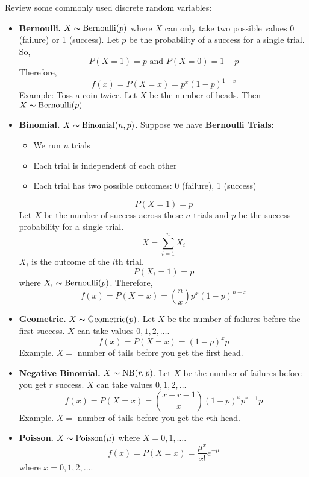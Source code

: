 Review some commonly used discrete random variables:
\begin{itemize}
    \item \textbf{Bernoulli.} $ X \thicksim \text{Bernoulli}(p) $
          where $ X $ can only take two possible values 0 (failure) or 1 (success).
          Let $ p $ be the probability of a success for a single trial. So,
          \[ P(X=1)=p\text{ and }P(X=0)=1-p \]
          Therefore,
          \[ f(x)=P(X=x)=p^x(1-p)^{1-x} \]
          Example: Toss a coin twice. Let $ X $ be the number of heads.
          Then $ X \thicksim \text{Bernoulli}(p) $
    \item \textbf{Binomial.} $ X \thicksim \operatorname{Binomial}(n,p) $. Suppose
          we have \textbf{Bernoulli Trials}:
          \begin{itemize}
              \item We run $ n $ trials
              \item Each trial is independent of each other
              \item Each trial has two possible outcomes: 0 (failure), 1 (success)
          \end{itemize}
          \[ P(X=1)=p \]
          Let $ X $ be the number of success across these $ n $ trials
          and $ p $ be the success probability for a single trial.
          \[ X=\sum\limits_{i=1}^{n} X_i \]
          $ X_i $ is the outcome of the $ i $th trial.
          \[ P(X_i=1)=p \]
          where $ X_i \thicksim \text{Bernoulli}(p) $. Therefore,
          \[ f(x)=P(X=x)=\binom{n}{x}p^x(1-p)^{n-x} \]
    \item \textbf{Geometric.} $ X \thicksim \operatorname{Geometric}(p) $.
          Let $ X $ be the number of failures before the first success.
          $ X $ can take values $ 0,1,2,\ldots $.
          \[ f(x)=P(X=x)=(1-p)^x p \]
          Example. $ X = $ number of tails before you get the first
          head.
    \item \textbf{Negative Binomial.} $ X \thicksim \operatorname{NB}(r,p) $.
          Let $ X $ be the number of failures before you get $ r $ success.
          $ X $ can take values $ 0,1,2,\ldots $
          \[ f(x)=P(X=x)=\binom{x+r-1}{x}(1-p)^x p^{r-1}p \]
          Example. $ X= $ number of tails before you get the $ r $th head.
    \item \textbf{Poisson.} $ X \thicksim \operatorname{Poisson}(\mu) $
          where $ X = 0,1,\ldots $.
          \[ f(x)=P(X=x)=\frac{\mu^x}{x!} e^{-\mu} \]
          where $ x=0,1,2,\ldots $.
\end{itemize}

